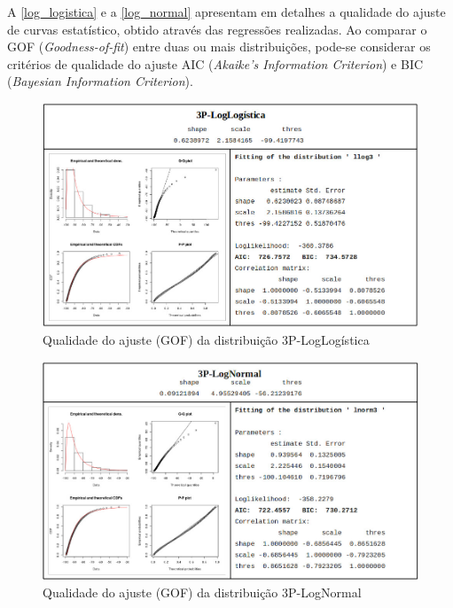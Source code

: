 \documentclass[
	12pt,				%
	twoside,			%
	a4paper,			%
	english,			%
	french,				%
	spanish,			%
	brazil				%
	]{abntex2}
\begin{document}
A \autoref{log_logistica} e a \autoref{log_normal} apresentam em
detalhes a qualidade do ajuste de curvas estatístico, obtido através das
regressões realizadas. Ao comparar o GOF (\emph{Goodness-of-fit}) entre
duas ou mais distribuições, pode-se considerar os critérios de qualidade
do ajuste AIC (\emph{Akaike's Information Criterion}) e BIC
(\emph{Bayesian Information Criterion}).

\begin{figure}[htb]
    \caption{\label{log_logistica} Qualidade do ajuste (GOF) da distribuição 3P-LogLogística}
    \begin{center}
        \includegraphics[scale=0.47]{imagens/log-logistica.jpg}
    \end{center}
\end{figure}
\begin{figure}[htb]
    \caption{\label{log_normal} Qualidade do ajuste (GOF) da distribuição 3P-LogNormal}
    \begin{center}
        \includegraphics[scale=0.47]{imagens/log-normal.jpg}
    \end{center}
\end{figure}
\end{document}
